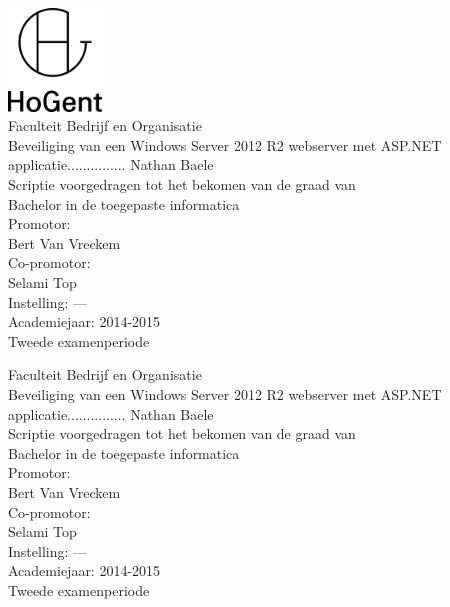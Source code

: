 \documentclass[pdftex,a4paper,12pt]{report}
\newcommand{\emptypage}{
\newpage
\thispagestyle{empty}
\mbox{}
\newpage
}
\newcommand{\student}{Nathan Baele}
\newcommand{\promotor}{Bert Van Vreckem}
\newcommand{\copromotor}{Selami Top}
\newcommand{\instelling}{---}
\newcommand{\titel}{Beveiliging van een Windows Server 2012 R2 webserver met ASP.NET applicatie...............}
\newcommand{\faculteit}{Faculteit Bedrijf en Organisatie}
\newcommand{\rapporttype}{Scriptie voorgedragen tot het bekomen van de graad van\\Bachelor in de toegepaste informatica}
\newcommand{\academiejaar}{2014-2015}
\newcommand{\examenperiode}{Tweede examenperiode}
\begin{document}

\begin{titlepage}
  \begin{center}

    \begingroup
    \rmfamily
    \includegraphics[width=2.5cm]{img/HG-beeldmerk-woordmerk}\\[.5cm]
    \faculteit\\[3cm]
    \titel
    \vfill
    \student\\[3.5cm]
    \rapporttype\\[2cm]
    Promotor:\\
    \promotor\\
    Co-promotor:\\
    \copromotor\\[2.5cm]
    Instelling: \instelling\\[.5cm]
    Academiejaar: \academiejaar\\[.5cm]
    \examenperiode
    \endgroup

  \end{center}
  \restoregeometry
\end{titlepage}


\emptypage


\begin{titlepage}
  \begin{center}

    \begingroup
    \rmfamily
    \faculteit\\[3cm]
    \titel
    \vfill
    \student\\[3.5cm]
    \rapporttype\\[2cm]
    Promotor:\\
    \promotor\\
    Co-promotor:\\
    \copromotor\\[2.5cm]
    Instelling: \instelling\\[.5cm]
    Academiejaar: \academiejaar\\[.5cm]
    \examenperiode
    \endgroup

  \end{center}
  \restoregeometry
\end{titlepage}
\end{document}
